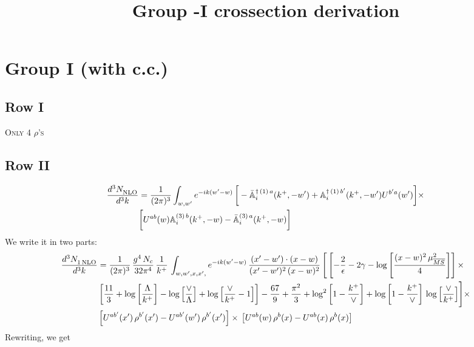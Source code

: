 \documentclass[9pt]{article}
\title{Group -I crossection derivation}
\author{}
\date{}
\def\mf#1{\mathbb{#1}}
\numberwithin{equation}{section}
\begin{document}
\maketitle
\section{Group I (with c.c.)}
\subsection{Row I\,}
\textsc{Only 4 $\rho$'s}
\subsection{Row II}
\begin{align}
    \frac{d^{3}N_{\rm NLO}^{\rm}}{d^{3}k} &  = \frac{1}{(2\pi)^{3}}  \int_{w, w^\prime} e^{-ik(w^\prime-w)}\,\bigg[-\bar{\mf{A}}^{\dagger\,(1)\,a}_{i}(k^{+},-w^{\prime})+\mf{A}^{\dagger\, (1)\, b^{\prime}}_{i}(k^{+},-w^{\prime})U^{b^{\prime}a}(w^{\prime})\bigg]\times \notag \\ & \bigg[U^{ab}(w)\mf{A}^{(3)\, b}_{i}(k^{+},- w)-\Bar{\mf{A}}^{(3)\, a}_{i}(k^{+}, - w)\bigg]\nonumber
\end{align}
We write it in two parts: 
\begin{align}
     \frac{d^{3}N_{1\,\rm NLO}^{\rm}}{d^{3}k} &  = \frac{1}{(2\pi)^{3}}\, \frac{g^{4}\,N_{c}}{32\pi^{4}}\,\frac{1}{k^{+}}\, \int_{w, w',x,x',} e^{-ik(w^\prime-w)}\, \frac{(x'-w')\cdot (x-w)}{(x'-w')^{2}\, (x-w)^{2}}\, \Bigg[\left[-\frac{2}{\epsilon}-2\gamma-\log{\left[\frac{(x-w)^{2}\,\mu^{2}_{\overline{MS}}}{4}\right]}\right]\times \notag \\ & \left[\frac{11}{3}+\log{\left[\frac{\Lambda}{k^{+}}\right]}-\log{\left[\frac{\vee}{\Lambda}\right]}+\log{\left[\frac{\vee}{k^{+}}-1\right]}\right]-\frac{67}{9}+\frac{\pi^{2}}{3}+\log^{2}{\left[1-\frac{k^{+}}{\vee}\right]}+\log{\left[1-\frac{k^{+}}{\vee}\right]}\,\log{\left[\frac{\vee}{k^{+}}\right]}\Bigg]\times\notag \\ & \left[U^{ab'}(x')\,\rho^{b'}(x') - U^{ab'}(w')\,\rho^{b'}(x')\right]\times\,\left[U^{ab}(w)\,\rho^{b}(x) - U^{ab}(x)\,\rho^{b}(x)\right]
\end{align}
Rewriting, we get
\end{document}
